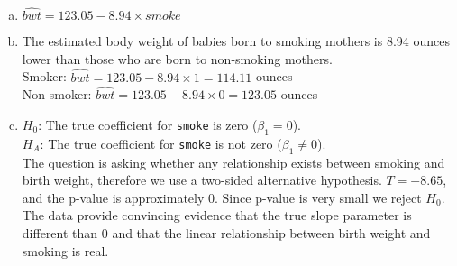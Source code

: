 {
\begin{enumerate}[(a)]
\setlength{\itemsep}{0mm}
\item $\widehat{bwt} = 123.05 - 8.94 \times smoke$
\item The estimated body weight of babies born to smoking mothers is 8.94 ounces lower than those who are born to non-smoking mothers. \\
Smoker: $\widehat{bwt} = 123.05 - 8.94 \times 1 = 114.11$ ounces \\
Non-smoker: $\widehat{bwt} = 123.05 - 8.94 \times 0 = 123.05$ ounces
\item $H_0$: The true coefficient for \texttt{smoke} is zero ($\beta_1 = 0$). \\
$H_A$: The true coefficient for \texttt{smoke} is not zero ($\beta_1 \ne 0$). \\
The question is asking whether any relationship exists between smoking and birth weight, therefore we use a two-sided alternative hypothesis. $T= -8.65$, and the p-value is approximately 0. Since p-value is very small we reject $H_0$. The data provide convincing evidence that the true slope parameter is different than 0 and that the linear relationship between birth weight and smoking is real.
\end{enumerate}
}\label{babiesWeight}


